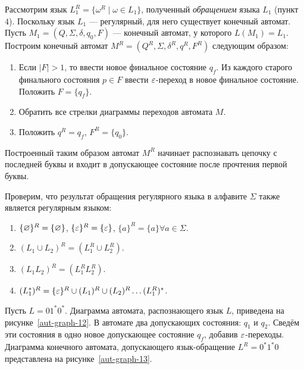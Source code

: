 Рассмотрим язык $L_1^R = \{ \omega^R \mid \omega \in L_1 \}$, 
полученный \emph{обращением} языка $L_1$ (пункт $4$). Поскольку язык 
$L_1$ --- регулярный, для него существует конечный автомат. Пусть $M_1 
= (Q,\Sigma, \delta, q_0, F)$ --- конечный автомат, у которого $L(M_1) 
= L_1$. Построим конечный автомат $M^R = (Q^R, \Sigma, \delta^R, q^R, F^R)$ 
следующим образом:
%
\begin{enumerate}

\item Если $\mid F \mid > 1$, то ввести новое финальное состояние 
$q_f$. Из каждого старого финального состояния $p \in F$ ввести 
$\varepsilon$-переход в новое финальное состояние. Положить $F = \{ q_f \}$.

\item Обратить все стрелки диаграммы переходов автомата $M$.

\item Положить $q^R = q_f$, $F^R = \{ q_0 \}$.

\end{enumerate}
%
Построенный таким образом автомат $M^R$ начинает распознавать цепочку с 
последней буквы и входит в допускающее состояние после прочтения первой 
буквы.

Проверим, что результат обращения регулярного языка в алфавите $\Sigma$ 
также является регулярным языком:
\begin{enumerate}
\item $\{ \varnothing \}^R = \{ \varnothing \} $, $\{ \varepsilon \}^R = \{ \varepsilon \} $, $\{ a \}^R = \{ a \} \forall a \in \Sigma $.
\item $(L_1 \cup L_2)^R = (L_{1}^R \cup L_{2}^R)$.
\item $(L_1 L_2)^R = (L_{1}^R L_{2}^R)$.
\item $(L_{1}^*)^R = \{ \varepsilon \}^R \cup (L_1)^R \cup (L_2)^R \ldots (L_{1}^R)^*$.
\end{enumerate}




\begin{myexample}\label{ex-511}
Пусть $L = 01^*0^*$. Диаграмма автомата, 
распознающего язык $L$, приведена на рисунке~\ref{aut-graph-12}. В 
автомате два допускающих состояния: $q_1$ и $q_2$. Сведём эти состояния в 
одно новое допускающее состояние $q_f$, добавив $\varepsilon$-переходы. 
Диаграмма конечного автомата, допускающего язык-обращение $L^R = 0^*1^*0$ 
представлена на рисунке~\ref{aut-graph-13}.
\end{myexample}

